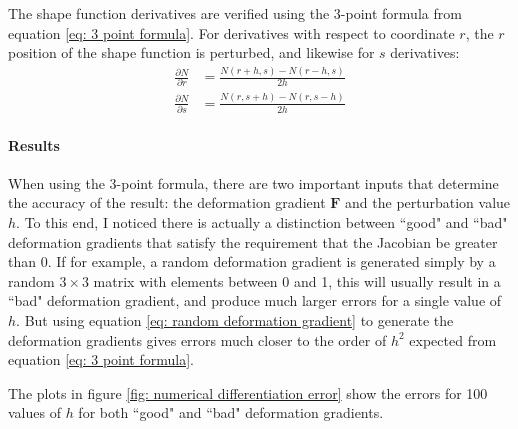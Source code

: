 \documentclass[]{spie}  %
\begin{document}
The shape function derivatives are verified using the 3-point formula from equation \ref{eq: 3 point formula}. For derivatives with respect to coordinate $r$, the $r$ position of the shape function is perturbed, and likewise for $s$ derivatives:
\begin{align}
\frac{\partial N}{\partial r} &= \frac{N(r + h, s) - N(r - h, s)}{2h} \\[1ex]
\frac{\partial N}{\partial s} &= \frac{N(r, s + h) - N(r, s - h)}{2h}
\end{align}

\paragraph{Results}
When using the 3-point formula, there are two important inputs that determine the accuracy of the result: the deformation gradient $\bm{F}$ and the perturbation value $h$. To this end, I noticed there is actually a distinction between ``good" and ``bad" deformation gradients that satisfy the requirement that the Jacobian be greater than 0. If for example, a random deformation gradient is generated simply by a random $3 \times 3$ matrix with elements between 0 and 1, this will usually result in a ``bad" deformation gradient, and produce much larger errors for a single value of $h$. But using equation \ref{eq: random deformation gradient} to generate the deformation gradients gives errors much closer to the order of $h^2$ expected from equation \ref{eq: 3 point formula}. 

The plots in figure \ref{fig: numerical differentiation error} show the errors for 100 values of $h$ for both ``good" and ``bad" deformation gradients. 
\end{document}
